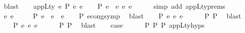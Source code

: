 \begin{isabellebody}
\ blast\isanewline
{}\isamarkupfalse%
\isanewline
\ \ \isamarkupfalse%
\ {\isacharparenleft}{\kern0pt}appL{\isacharunderscore}{\kern0pt}ty\ e{}\ P\ e{}{\isacharprime}{\kern0pt}\ e{}{\isacharparenright}{\kern0pt}\isanewline
\ \ \isamarkupfalse%
\ P{}{\isacharcolon}{\kern0pt}\ {\isachardoublequoteopen}e{}\ {\isasymcdot}\ e{}\ {\isasymsimeq}e\ e{}{\isacharprime}{\kern0pt}{\isachardoublequoteclose}\isanewline
\ \ \ \ \isamarkupfalse%
\ {\isacharparenleft}{\kern0pt}simp\ add{\isacharcolon}{\kern0pt}\ appL{\isacharunderscore}{\kern0pt}ty{\isachardot}{\kern0pt}prems{\isacharparenright}{\kern0pt}\isanewline
\isanewline
\ \ \isamarkupfalse%
\ e{}{\isacharprime}{\kern0pt}{\isacharprime}{\kern0pt}\ e{}{\isacharprime}{\kern0pt}{\isacharprime}{\kern0pt}\ \isanewline
\ \ \ \ P{}{\isacharcolon}{\kern0pt}\ {\isachardoublequoteopen}e{}{\isacharprime}{\kern0pt}\ {\isacharequal}{\kern0pt}\ e{}{\isacharprime}{\kern0pt}{\isacharprime}{\kern0pt}\ {\isasymcdot}\ e{}{\isacharprime}{\kern0pt}{\isacharprime}{\kern0pt}{\isachardoublequoteclose}\isanewline
\ \ \isamarkupfalse%
\ P{}\ econg{\isacharunderscore}{\kern0pt}symp\ \isamarkupfalse%
\ blast\isanewline
\isanewline
\ \ \isamarkupfalse%
\ P{}{\isacharcolon}{\kern0pt}\ {\isachardoublequoteopen}e{}\ {\isasymsimeq}e\ e{}{\isacharprime}{\kern0pt}{\isacharprime}{\kern0pt}{\isachardoublequoteclose}\isanewline
\ \ \ \ \isamarkupfalse%
\ P{}\ P{}\ \isamarkupfalse%
\ blast\isanewline
\ \ \isamarkupfalse%
\ P{}{\isacharcolon}{\kern0pt}\ {\isachardoublequoteopen}e{}\ {\isasymsimeq}e\ e{}{\isacharprime}{\kern0pt}{\isacharprime}{\kern0pt}{\isachardoublequoteclose}\isanewline
\ \ \ \ \isamarkupfalse%
\ P{}\ P{}\ \isamarkupfalse%
\ blast\isanewline
\isanewline
\ \ \isamarkupfalse%
\ {\isacharquery}{\kern0pt}case\isanewline
\ \ \ \ \isamarkupfalse%
\ P{}\ P{}\ P{}\ appL{\isacharunderscore}{\kern0pt}ty{\isachardot}{\kern0pt}hyps{\isacharparenleft}{\kern0pt}{}{\isacharparenright}{\kern0pt}\ \isamarkupfalse%

\end{isabellebody}
